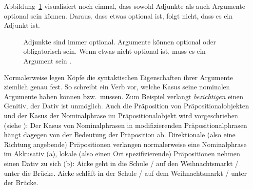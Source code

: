 \noindent
Abbildung~\ref{fig-optional-arguments-adjuncts} visualisiert noch einmal, dass sowohl Adjunkte als auch Argumente
optional sein können. Daraus, dass etwas optional ist, folgt nicht, dass es ein Adjunkt ist.
\begin{figure}
\caption{\label{fig-optional-arguments-adjuncts}Adjunkte sind immer optional. Argumente können
  optional oder obligatorisch sein. Wenn etwas nicht optional ist, muss es
  ein Argument sein \citep[§1182]{Duden2005}.} 
\end{figure}

\noindent
Normalerweise legen Köpfe die syntaktischen Eigenschaften ihrer Argumente
ziemlich genau fest. So schreibt ein Verb vor, welche Kasus seine nominalen
Argumente haben können bzw.\ müssen. Zum Beispiel verlangt \emph{bezichtigen} einen Genitiv, der
Dativ ist unmöglich.
\eal
{}
\zl
Auch die Präposition von Präpositionalobjekten und der Kasus der Nominalphrase
im Präpositionalobjekt wird vorgeschrieben (siehe \citealt[]{Eisenberg94a}):
\eal
{}
\zl
Der Kasus von Nominalphrasen in modifizierenden Präpositionalphrasen hängt dagegen
von der Bedeutung der Präposition ab. Direktionale (also eine Richtung angebende) Präpositionen 
verlangen normalerweise eine Nominalphrase im Akkusativ (a), lokale (also einen Ort spezifizierende)
Präpositionen nehmen einen Dativ zu sich (b):
\eal
\ex Aicke geht in die Schule / auf den Weihnachtsmarkt / unter die Brücke.
\ex Aicke schläft in der Schule / auf dem Weihnachtsmarkt / unter der Brücke.
\zl

